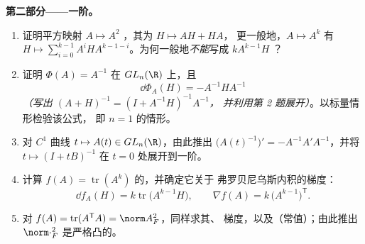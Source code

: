 \begin{problem}
\medskip
\noindent\textbf{第二部分——一阶。}
\begin{enumerate}[resume]
  \item 证明平方映射 $A \mapsto A^2$
        ，其为 $H \mapsto AH + HA$，
        更一般地，$A \mapsto A^k$ 有
         $H \mapsto \sum_{i=0}^{k-1}
        A^iHA^{k-1-i}$。为何一般地\emph{不能}写成 $kA^{k-1}H$
        ？
  \item 证明 $\Phi(A) = A^{-1}$ 在
        $GL_n(\R)$ 上，且
        \[
        \dd\Phi_A(H) = -A^{-1}HA^{-1}
        \]
        \emph{（写出 $(A + H)^{-1} = (I + A^{-1}H)^{-1}A^{-1}$，
        并利用第 2 题展开）}。以标量情形检验该公式，
        即 $n = 1$ 的情形。
  \item 对 $C^1$ 曲线 $t \mapsto A(t) \in GL_n(\R)$，由此推出
        $\bigl(A(t)^{-1}\bigr)' = -A^{-1}A'A^{-1}$，并将
        $t \mapsto (I + tB)^{-1}$ 在 $t = 0$ 处展开到一阶。
  \item 计算 $f(A) =
        \operatorname{tr}(A^k)$ 的，并确定它关于
        弗罗贝尼乌斯内积的梯度：
        \[
        \dd f_A(H) = k\operatorname{tr}\bigl(A^{k-1}H\bigr),
        \qquad
        \nabla f(A) = k\,\bigl(A^{k-1}\bigr)^{\mathsf T} .
        \]
  \item 对 $f(A) = \operatorname{tr}
        (A^{\mathsf T}A) = \norm A_F^2$，同样求其、
        梯度，以及（常值）；由此推出
        $\norm\cdot_F^2$ 是严格凸的。
\end{enumerate}


\end{problem}
